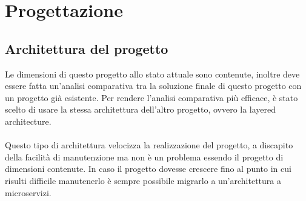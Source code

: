 
\chapter{Progettazione}
\label{cap:progettazione}


\section{Architettura del progetto}
Le dimensioni di questo progetto allo stato attuale sono contenute, inoltre deve essere fatta un'analisi
comparativa tra la soluzione finale di questo progetto con un progetto già esistente. Per rendere 
l'analisi comparativa più efficace, è stato scelto di usare la stessa architettura dell'altro progetto, 
ovvero la layered architecture.
\\\\
Questo tipo di architettura velocizza la realizzazione del progetto, a discapito della facilità di
manutenzione ma non è un problema essendo il progetto di dimensioni contenute. In caso
il progetto dovesse crescere fino al punto in cui risulti difficile manutenerlo è sempre possibile
migrarlo a un'architettura a microservizi.


